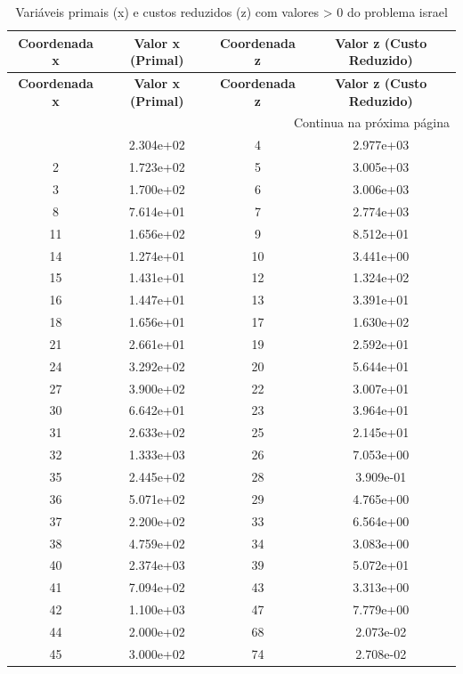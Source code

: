 \documentclass[12pt]{article}
\begin{document}
\begin{longtable}{@{}cccc@{}}
\caption{Variáveis primais (x) e custos reduzidos (z) com valores > 0 do problema israel} \\
\toprule
\textbf{Coordenada x} & \textbf{Valor x (Primal)} & \textbf{Coordenada z} & \textbf{Valor z (Custo Reduzido)} \\
\midrule
\endfirsthead

\toprule
\textbf{Coordenada x} & \textbf{Valor x (Primal)} & \textbf{Coordenada z} & \textbf{Valor z (Custo Reduzido)} \\
\midrule
\endhead

\midrule \multicolumn{4}{r}{{Continua na próxima página}} \\ \midrule
\endfoot

\bottomrule
\endlastfoot
1 & 2.304e+02 & 4 & 2.977e+03 \\
2 & 1.723e+02 & 5 & 3.005e+03 \\
3 & 1.700e+02 & 6 & 3.006e+03 \\
8 & 7.614e+01 & 7 & 2.774e+03 \\
11 & 1.656e+02 & 9 & 8.512e+01 \\
14 & 1.274e+01 & 10 & 3.441e+00 \\
15 & 1.431e+01 & 12 & 1.324e+02 \\
16 & 1.447e+01 & 13 & 3.391e+01 \\
18 & 1.656e+01 & 17 & 1.630e+02 \\
21 & 2.661e+01 & 19 & 2.592e+01 \\
24 & 3.292e+02 & 20 & 5.644e+01 \\
27 & 3.900e+02 & 22 & 3.007e+01 \\
30 & 6.642e+01 & 23 & 3.964e+01 \\
31 & 2.633e+02 & 25 & 2.145e+01 \\
32 & 1.333e+03 & 26 & 7.053e+00 \\
35 & 2.445e+02 & 28 & 3.909e-01 \\
36 & 5.071e+02 & 29 & 4.765e+00 \\
37 & 2.200e+02 & 33 & 6.564e+00 \\
38 & 4.759e+02 & 34 & 3.083e+00 \\
40 & 2.374e+03 & 39 & 5.072e+01 \\
41 & 7.094e+02 & 43 & 3.313e+00 \\
42 & 1.100e+03 & 47 & 7.779e+00 \\
44 & 2.000e+02 & 68 & 2.073e-02 \\
45 & 3.000e+02 & 74 & 2.708e-02 \\

\end{longtable}
\end{document}
